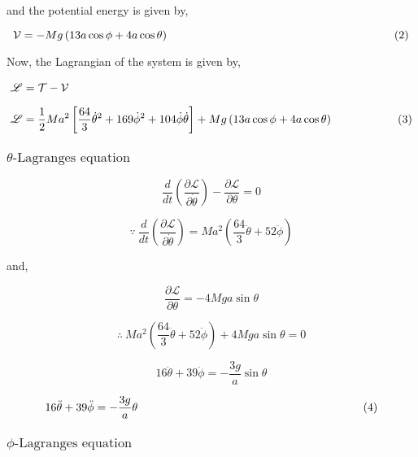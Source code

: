 \documentclass[12pt, a4paper]{article} %
\begin{document}
and the potential energy is given by, 

\[\mathcal{V} = -Mg\left(13a\cos\phi + 4a\cos\theta\right)\hspace*{7cm}(2)\]

Now, the Lagrangian of the system is given by, 

\begin{equation*}
    \begin{split}
        \mathscr{L} & = \mathcal{T - V}\\[2mm]
        \mathscr{L} & = \frac{1}{2}Ma^2\left[\frac{64}{3}\dot{\theta}^2 + 169\dot{\phi}^2  + 104\dot{\phi}\dot{\theta}\right] + Mg\left(13a\cos\phi + 4a\cos\theta\right)\hspace*{2cm}(3)
    \end{split}
\end{equation*}

\subsubsection*{$\theta\mbox{-Lagranges equation}$}

\[\frac{d}{dt}\left(\frac{\partial \mathscr{L}}{\partial \dot{\theta}}\right) - \frac{\partial \mathscr{L}}{\partial \theta} = 0\]

\[\because\ \frac{d}{dt}\left(\frac{\partial \mathscr{L}}{\partial \dot{\theta}}\right) = Ma^2\left(\frac{64}{3}\ddot{\theta} + 52\ddot{\phi}\right)\]

and,

\[\frac{\partial \mathscr{L}}{\partial \theta} = -4Mga\sin\theta\]

\[\therefore \ Ma^2\left(\frac{64}{3}\ddot{\theta} + 52\ddot{\phi}\right) + 4Mga\sin\theta = 0\]

\[16\ddot{\theta} + 39\ddot{\phi} = -\frac{3g}{a}\sin\theta\]

\begin{center}
    \begin{equation*}
        16\ddot{\theta} + 39\ddot{\phi} = -\frac{3g}{a}\theta\hspace*{7cm}(4)
    \end{equation*}
\end{center}

\subsubsection*{$\phi\mbox{-Lagranges equation}$}

\BgThispage
\end{document}
